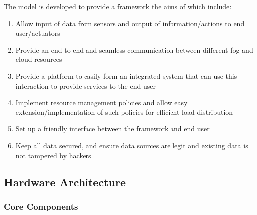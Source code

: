 \documentclass[10pt,journal,compsoc]{IEEEtran}
\begin{document}
The model is developed to provide a framework the aims of which include:
\begin{enumerate}
\item Allow input of data from sensors and output of information/actions to end user/actuators
\item Provide an end-to-end and seamless communication between different fog and cloud resources
\item Provide a platform to easily form an integrated system that can use this interaction to provide services to the end user
\item Implement resource management policies and allow easy extension/implementation of such policies for efficient load distribution
\item Set up a friendly interface between the framework and end user
\item Keep all data secured, and ensure data sources are legit and existing data is not tampered by hackers
\end{enumerate}

\subsection{Hardware Architecture}

\subsubsection{Core Components}
\end{document}
